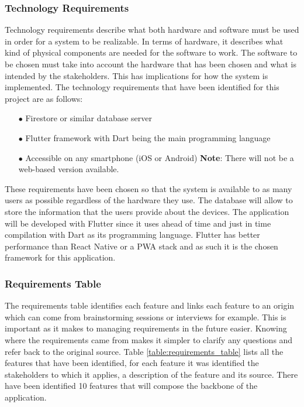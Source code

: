 \subsubsection{Technology Requirements}

Technology requirements describe what both hardware and software must be
used in order for a system to be realizable. In terms of hardware, it describes
what kind of physical components are needed for the software to work. The
software to be chosen must take into account the hardware that has been
chosen and what is intended by the stakeholders. This has implications for
how the system is implemented.
\newline
The technology requirements that have been identified for this project are as follows:
\begin{itemize}
    \item[$\bullet$] Firestore or similar database server
    \item[$\bullet$] Flutter framework with Dart being the main programming language
    \item[$\bullet$] Accessible on any smartphone (iOS or Android) \newline \textbf{Note}: There will not be a web-based version available.
\end{itemize}
These requirements have been chosen so that the system is available to as
many users as possible regardless of the hardware they use. The database
will allow to store the information that the users provide about the \hyperlink{\acronym}{\acronym}
devices. The application will be developed with Flutter since it uses ahead
of time and just in time compilation with Dart as its programming language.
Flutter has better performance than React Native or a PWA stack and as such it is the chosen framework for
this application.

\subsubsection{Requirements Table}

The requirements table identifies each feature and links each feature to an origin
which can come from brainstorming sessions or interviews for example.
This is important as it makes to managing requirements in the future easier.
Knowing where the requirements came from makes it simpler to clarify any questions
and refer back to the original source.
\newline
Table \ref{table:requirements_table} lists all the features that have been identified, for
each feature it was identified the stakeholders to which it applies, a description
of the feature and its source. There have been identified 10 features that will
compose the backbone of the application.

